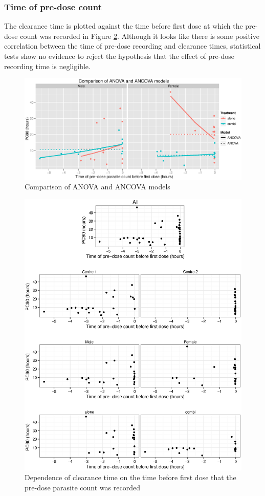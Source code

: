 \subsubsection*{Time of pre-dose count}
The clearance time is plotted against the time before first dose at which the pre-dose count was recorded in Figure \ref{pretime-ancova}. Although it looks like there is some positive correlation between the time of pre-dose recording and clearance times, statistical tests show no evidence to reject the hypothesis that the effect of pre-dose recording time is negligible.
\begin{figure}[h]
\includegraphics[width=150mm]{compancova2.eps} 
\caption{Comparison of ANOVA and ANCOVA models}
\label{compancova2}
\end{figure}
\begin{figure}[p]
\includegraphics[width=150mm]{pretime-ancova.eps} 
\caption{Dependence of clearance time on the time before first dose that the pre-dose parasite count was recorded}
\label{pretime-ancova}
\end{figure}

